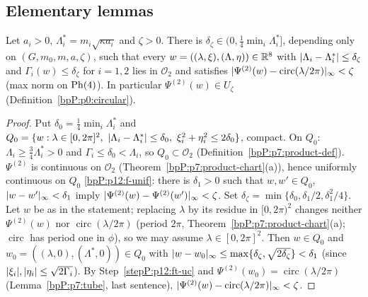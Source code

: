 \subsection{Elementary lemmas}\label{bpP:p12:sec-lem}

\begin{lemma}\label{bpP:p12:forward-tube}
Let $a_i>0$, $\Lambda_i^*=m_i\sqrt{\kappa a_i}$ and $\zeta>0$. There is $\delta_\zeta\in\bigl(0,\tfrac14\min_i\Lambda_i^*\bigr]$, depending only on $(G,m_0,m,a,\zeta)$, such that every $w=((\lambda,\xi),(\Lambda,\eta))\in\mathbb{R}^8$ with $\lvert \Lambda_i-\Lambda_i^*\rvert\le\delta_\zeta$ and $\Gamma_i(w)\le\delta_\zeta$ for $i=1,2$ lies in $\mathcal O_2$ and satisfies $\lvert \Psi^{(2)}(w)-\operatorname{circ}(\lambda/2\pi)\rvert_\infty<\zeta$ (max norm on $\mathrm{Ph}(4)$). In particular $\Psi^{(2)}(w)\in U_\zeta$ (Definition~\ref{bpP:p0:circular}).
\end{lemma}
\begin{proof}
\label{stepP:p12:ft-cpt} Put $\delta_0=\frac14\min_i\Lambda_i^*$ and $Q_0=\{w:\lambda\in[0,2\pi]^2,\ \abs{\Lambda_i-\Lambda_i^*}\le\delta_0,\ \xi_i^2+\eta_i^2\le2\delta_0\}$, compact. On $Q_0$: $\Lambda_i\ge\frac34\Lambda_i^*>0$ and $\Gamma_i\le\delta_0<\Lambda_i$, so $Q_0\subset\mathcal O_2$ (Definition~\ref{bpP:p7:product-def}).
\label{stepP:p12:ft-uc} $\Psi^{(2)}$ is continuous on $\mathcal O_2$ (Theorem~\ref{bpP:p7:product-chart}(a)), hence uniformly continuous on $Q_0$ \ref{bpP:p12:f-unif}: there is $\delta_1>0$ such that $w,w'\in Q_0$, $\lvert w-w'\rvert_\infty<\delta_1$ imply $\lvert \Psi^{(2)}(w)-\Psi^{(2)}(w')\rvert_\infty<\zeta$. Set $\delta_\zeta=\min\{\delta_0,\delta_1/2,\delta_1^2/4\}$.
\label{stepP:p12:ft-cmp} Let $w$ be as in the statement; replacing $\lambda$ by its residue in $[0,2\pi)^2$ changes neither $\Psi^{(2)}(w)$ nor $\operatorname{circ}(\lambda/2\pi)$ (period $2\pi$, Theorem~\ref{bpP:p7:product-chart}(a); $\operatorname{circ}$ has period one in $\phi$), so we may assume $\lambda\in[0,2\pi]^2$. Then $w\in Q_0$ and $w_0=((\lambda,0),(\Lambda^*,0))\in Q_0$ with $\lvert w-w_0\rvert_\infty\le\max\{\delta_\zeta,\sqrt{2\delta_\zeta}\}<\delta_1$ (since $\lvert \xi_i\rvert,\lvert \eta_i\rvert\le\sqrt{2\Gamma_i}$). By Step~\ref{stepP:p12:ft-uc} and $\Psi^{(2)}(w_0)=\operatorname{circ}(\lambda/2\pi)$ (Lemma~\ref{bpP:p7:tube}, last sentence), $\lvert \Psi^{(2)}(w)-\operatorname{circ}(\lambda/2\pi)\rvert_\infty<\zeta$.
\end{proof}

